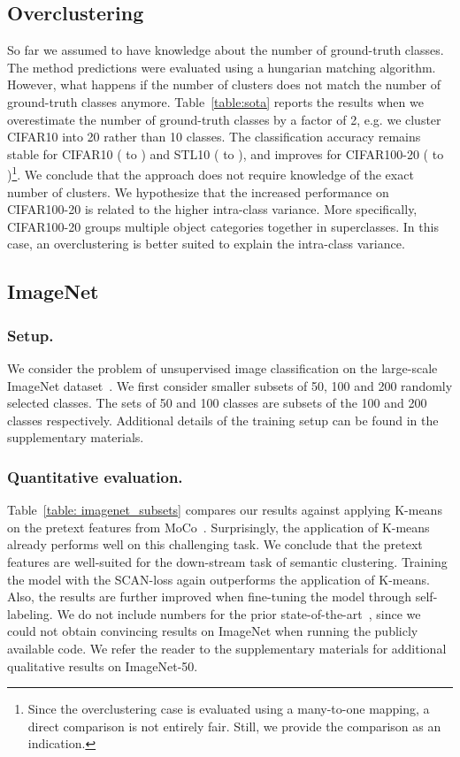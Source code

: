 \documentclass[runningheads]{llncs}
\begin{document}
\subsection{Overclustering}
\label{subsec: experiments_overclustering}
So far we assumed to have knowledge about the number of ground-truth classes. The method predictions were evaluated using a hungarian matching algorithm. However, what happens if the number of clusters does not match the number of ground-truth classes anymore. Table~\ref{table:sota} reports the results when we overestimate the number of ground-truth classes by a factor of 2, e.g. we cluster CIFAR10 into 20 rather than 10 classes. The classification accuracy remains stable for CIFAR10 ( to ) and STL10 ( to ), and improves for CIFAR100-20 ( to )\footnote{Since the overclustering case is evaluated using a many-to-one mapping, a direct comparison is not entirely fair. Still, we provide the comparison as an indication.}. We conclude that the approach does not require knowledge of the exact number of clusters. We hypothesize that the increased performance on CIFAR100-20 is related to the higher intra-class variance. More specifically, CIFAR100-20 groups multiple object categories together in superclasses. In this case, an overclustering is better suited to explain the intra-class variance. 

\subsection{ImageNet}
\label{subsec: experiments_imagenet}
\subsubsection{Setup.}
We consider the problem of unsupervised image classification on the large-scale ImageNet dataset~\cite{ImageNet}. We first consider smaller subsets of 50, 100 and 200 randomly selected classes. The sets of 50 and 100 classes are subsets of the 100 and 200 classes respectively. Additional details of the training setup can be found in the supplementary materials. 

\subsubsection{Quantitative evaluation.}
Table~\ref{table: imagenet_subsets} compares our results against applying K-means on the pretext features from MoCo~\cite{chen2020improved}. Surprisingly, the application of K-means already performs well on this challenging task. We conclude that the pretext features are well-suited for the down-stream task of semantic clustering. Training the model with the SCAN-loss again outperforms the application of K-means. Also, the results are further improved when fine-tuning the model through self-labeling. We do not include numbers for the prior state-of-the-art~\cite{IIC}, since we could not obtain convincing results on ImageNet when running the publicly available code. We refer the reader to the supplementary materials for additional qualitative results on ImageNet-50.
\end{document}

